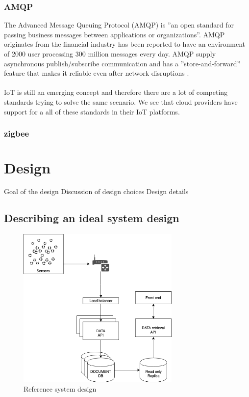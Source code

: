\documentclass[]{uiophd}
\begin{document}
\subsection{AMQP}
The Advanced Message Queuing Protocol (AMQP) is ''an open standard for passing business messages between applications or organizations''\cite{amqp}. AMQP originates from the financial industry has been reported to have an environment of 2000 user processing 300 million messages every day. AMQP supply asynchronous publish/subscribe communication and has a ''store-and-forward'' feature that makes it reliable even after network disruptions \cite{karagiannis2015survey}. 
\\\\
IoT is still an emerging concept and therefore there are a lot of competing standards trying to solve the same scenario. We see that cloud providers have support for a all of these standards in their IoT platforms.

\subsection{zigbee}

\chapter{Design}

Goal of the design
Discussion of design choices
Design details

\section{Describing an ideal system design}
\begin{figure}[h]
\caption{Reference system design}
\centering
\includegraphics[width=8cm]{ideal_system_design.png}

\end{figure}
\end{document}
